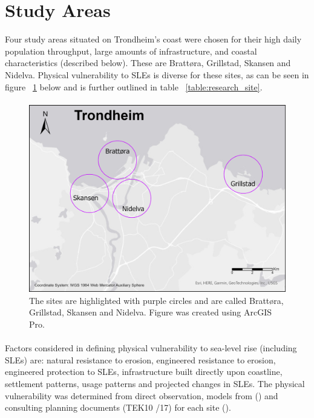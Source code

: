 \section{Study Areas}
Four study areas situated on Trondheim's coast were chosen for their high daily population throughput, large amounts of infrastructure, and coastal characteristics (described below). These are Brattøra, Grillstad, Skansen and Nidelva. Physical vulnerability to SLEs is diverse for these sites, as can be seen in figure ~\ref{fig:research_site} below and is further outlined in table ~\ref{table:research_site}. 
\paragraph{}

\begin{figure} [H]
    \centering
    \includegraphics[width=1.0\textwidth]{fig/trondheim_research_sites_grey_circles.png}
    \caption[Research sites - Trondheim]{The sites are highlighted with purple circles and are called Brattøra, Grillstad, Skansen and Nidelva. Figure was created using ArcGIS Pro.}
    \label{fig:research_site}
\end{figure}

\paragraph{}


Factors considered in defining physical vulnerability to sea-level rise (including SLEs) are: natural resistance to erosion, engineered resistance to erosion, engineered protection to SLEs, infrastructure built directly upon coastline, settlement patterns, usage patterns and projected changes in SLEs. The physical vulnerability was determined from direct observation,  models from (\cite{kartverket_se_2020}) and consulting planning documents (TEK10 /17) for each site (\cite{miljoenheten_og_byplankontoret_trondheim_kommune_9-notat-om-havnivastigning-og-stormflo---hensyn-i-arealplanlegging-nyhavnapdf_2020}). 


